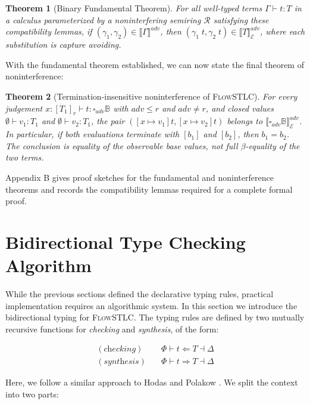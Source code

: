 \documentclass[conference]{IEEEtran}
\newcommand\gradedt[2]{\square_{#1} #2}
\newcommand\cale{\mathcal{E}}
\newcommand\checking{\Leftarrow}
\newcommand\synthesis{\Rightarrow}
\newcommand\base{\mathbb{B}}
\newtheorem{theorem}{Theorem}
\begin{document}
\begin{theorem}[Binary Fundamental Theorem]
    For all well-typed terms $\Gamma\vdash t:T$ in a calculus parameterized by a noninterfering semiring $\mathcal R$ satisfying these compatibility lemmas, if $(\gamma_1,\gamma_2)\in\llbracket\Gamma\rrbracket^{adv}$, then $(\gamma_1\; t,\gamma_2\; t)\in\llbracket T\rrbracket^{adv}_\cale$, where each substitution is capture avoiding.
\end{theorem}

With the fundamental theorem established, we can now state the final theorem of noninterference:

\begin{theorem}[Termination-insensitive noninterference of \textsc{FlowSTLC}]
    For every judgement $x:[T_1]_r\vdash t:\gradedt{adv}{\base}$ with $adv\le r$ and $adv\ne r$, and closed values $\emptyset\vdash v_1:T_1$ and $\emptyset\vdash v_2:T_1$, the pair
    $([x\mapsto v_1]t,[x\mapsto v_2]t)$ belongs to $\llbracket\gradedt{adv}{\base}\rrbracket^{adv}_\cale$. In particular, if both evaluations terminate with $[b_1]$ and $[b_2]$, then $b_1=b_2$. The conclusion is equality of the observable base values, not full $\beta$-equality of the two terms.
\end{theorem}

Appendix B gives proof sketches for the fundamental and noninterference theorems and records the compatibility lemmas required for a complete formal proof.

\section{Bidirectional Type Checking Algorithm}

While the previous sections defined the declarative typing rules, practical implementation requires an algorithmic system. In this section we introduce the bidirectional typing for \textsc{FlowSTLC}. The typing rules are defined by two mutually recursive functions for \emph{checking} and \emph{synthesis}, of the form:

\begin{equation}
    \begin{split}
        (\textit{checking})\quad&\Phi\vdash t\checking T\dashv\Delta\\
        (\textit{synthesis})\quad&\Phi\vdash t\synthesis T\dashv\Delta
    \end{split}
\end{equation}

Here, we follow a similar approach to Hodas \cite{hodas1994logic} and Polakow \cite{polakow2015embedding}. We split the context into two parts:
\end{document}
